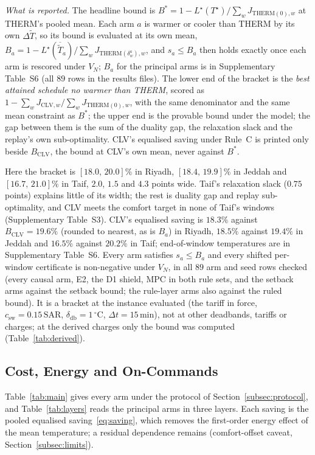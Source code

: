 \documentclass[pdflatex,sn-mathphys-num,iicol]{sn-jnl}
\theoremstyle{thmstyleone}\newtheorem{proposition}{Proposition}\newtheorem{corollary}{Corollary}
\theoremstyle{thmstyletwo}\newtheorem{remark}{Remark}\newtheorem{observation}{Observation}
\theoremstyle{thmstylethree}\newtheorem{definition}{Definition}
\newcommand{\deadband}{\delta_{\mathrm{db}}}
\newcommand{\csw}{c_{\mathrm{sw}}}
\newcommand{\SAR}{\text{SAR}}
\begin{document}
\emph{What is reported.} The headline bound is $B^{\ast}=1-L^{\star}(T^{\star})/\sum_wJ_{\mathrm{THERM}(0),w}$ at THERM's pooled mean. Each arm $a$ is warmer or cooler than THERM by its own $\Delta\tilde T$, so its bound is evaluated at its own mean, $B_a=1-L^{\star}(\overline{\tilde T}_a)/\sum_wJ_{\mathrm{THERM}(\delta^a_w),w}$, and $s_a\le B_a$ then holds exactly once each arm is rescored under $V_N$; $B_a$ for the principal arms is in Supplementary Table~S6 (all $89$ rows in the results files). The lower end of the bracket is the \emph{best attained schedule no warmer than THERM}, scored as $1-\sum_wJ_{\mathrm{CLV},w}/\sum_wJ_{\mathrm{THERM}(0),w}$, with the same denominator and the same mean constraint as $B^{\ast}$; the upper end is the provable bound under the model; the gap between them is the sum of the duality gap, the relaxation slack and the replay's own sub-optimality. CLV's equalised saving under Rule~C is printed only beside $B_{\mathrm{CLV}}$, the bound at CLV's own mean, never against $B^{\ast}$.

Here the bracket is $[18.0,\,20.0]\%$ in Riyadh, $[18.4,\,19.9]\%$ in Jeddah and $[16.7,\,21.0]\%$ in Taif, $2.0$, $1.5$ and $4.3$ points wide. Taif's relaxation slack ($0.75$ points) explains little of its width; the rest is duality gap and replay sub-optimality, and CLV meets the comfort target in none of Taif's windows (Supplementary Table~S3). CLV's equalised saving is $18.3\%$ against $B_{\mathrm{CLV}}=19.6\%$ (rounded to nearest, as is $B_a$) in Riyadh, $18.5\%$ against $19.4\%$ in Jeddah and $16.5\%$ against $20.2\%$ in Taif; end-of-window temperatures are in Supplementary Table~S6. Every arm satisfies $s_a\le B_a$ and every shifted per-window certificate is non-negative under $V_N$, in all $89$ arm and seed rows checked (every causal arm, E2, the D1 shield, MPC in both rule sets, and the setback arms against the setback bound; the rule-layer arms also against the ruled bound). It is a bracket at the instance evaluated (the tariff in force, $\csw=0.15\,\SAR$, $\deadband=1\,^\circ$C, $\Delta t=15\,$min), not at other deadbands, tariffs or charges; at the derived charges only the bound was computed (Table~\ref{tab:derived}).

\subsection{Cost, Energy and On-Commands}
\label{subsec:consumption}

Table~\ref{tab:main} gives every arm under the protocol of Section~\ref{subsec:protocol}, and Table~\ref{tab:layers} reads the principal arms in three layers. Each saving is the pooled equalised saving~\eqref{eq:saving}, which removes the first-order energy effect of the mean temperature; a residual dependence remains (comfort-offset caveat, Section~\ref{subsec:limits}).
\end{document}
